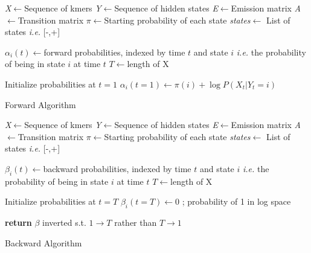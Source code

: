 \begin{algorithm}[H]
\DontPrintSemicolon
{}
\SetAlgoLined
\emph{X}$\leftarrow$Sequence of kmers\;
\emph{Y}$\leftarrow$Sequence of hidden states\;
\emph{E}$\leftarrow$Emission matrix\;
\emph{A}$\leftarrow$Transition matrix\;
\emph{$\pi$}$\leftarrow$Starting probability of each state\;
\emph{states}$\leftarrow$ List of states \emph{i.e.} [-,+]\;
\;

$\alpha_i(t)\leftarrow$forward probabilities, indexed by time $t$ and state $i$ \emph{i.e.} the probability of being in state $i$ at time $t$\;
$T\leftarrow$length of X\;\; 

Initialize probabilities at $t=1$\;
$\alpha_i(t=1)\leftarrow \pi(i) + \log P(X_t |Y_t = i)$\;\;
 \caption{Forward Algorithm}
 \label{fwd}
\end{algorithm}

\begin{algorithm}[H]
\DontPrintSemicolon
{}
\SetAlgoLined
\emph{X}$\leftarrow$Sequence of kmers\;
\emph{Y}$\leftarrow$Sequence of hidden states\;
\emph{E}$\leftarrow$Emission matrix\;
\emph{A}$\leftarrow$Transition matrix\;
\emph{$\pi$}$\leftarrow$Starting probability of each state\;
\emph{states}$\leftarrow$ List of states \emph{i.e.} [-,+]\;
\;

$\beta_i(t)\leftarrow$backward probabilities, indexed by time $t$ and state $i$ \emph{i.e.} the probability of being in state $i$ at time $t$\;
$T\leftarrow$length of X\;\; 

Initialize probabilities at $t=T$\;
$\beta_i(t=T)\leftarrow 0$ ; probability of 1 in log space\;\;

\textbf{return} $\beta$ inverted s.t. $1\rightarrow T$ rather than $T \rightarrow 1$\;
 \caption{Backward Algorithm}
 \label{bwd}
\end{algorithm}